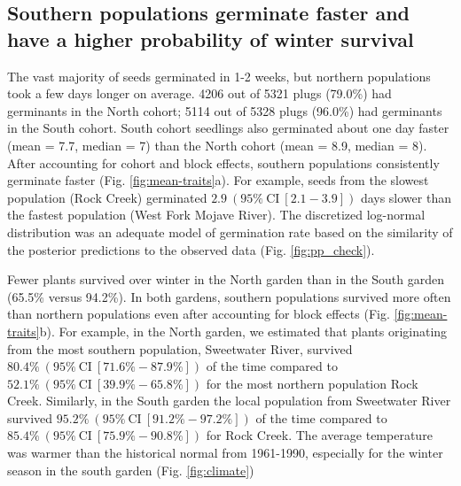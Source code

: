 \documentclass[
  12pt,
]{article}
\begin{document}
\hypertarget{southern-populations-germinate-faster-and-have-a-higher-probability-of-winter-survival}{%
\subsection{Southern populations germinate faster and have a higher probability of winter survival}\label{southern-populations-germinate-faster-and-have-a-higher-probability-of-winter-survival}}

The vast majority of seeds germinated in 1-2 weeks, but northern populations took a few days longer on average. 4206 out of 5321 plugs (79.0\%) had germinants in the North cohort; 5114 out of 5328 plugs (96.0\%) had germinants in the South cohort. South cohort seedlings also germinated about one day faster (mean = 7.7, median = 7) than the North cohort (mean = 8.9, median = 8). After accounting for cohort and block effects, southern populations consistently germinate faster (Fig. \ref{fig:mean-traits}a). For example, seeds from the slowest population (Rock Creek) germinated \(2.9~(95\%~\text{CI}~[2.1-3.9])\) days slower than the fastest population (West Fork Mojave River). The discretized log-normal distribution was an adequate model of germination rate based on the similarity of the posterior predictions to the observed data (Fig. \ref{fig:pp_check}).

Fewer plants survived over winter in the North garden than in the South garden (65.5\% versus 94.2\%). In both gardens, southern populations survived more often than northern populations even after accounting for block effects (Fig. \ref{fig:mean-traits}b). For example, in the North garden, we estimated that plants originating from the most southern population, Sweetwater River, survived \(80.4\%~(95\%~\text{CI}~[71.6\%-87.9\%])\) of the time compared to \(52.1\%~(95\%~\text{CI}~[39.9\%-65.8\%])\) for the most northern population Rock Creek. Similarly, in the South garden the local population from Sweetwater River survived \(95.2\%~(95\%~\text{CI}~[91.2\%-97.2\%])\) of the time compared to \(85.4\%~(95\%~\text{CI}~[75.9\%-90.8\%])\) for Rock Creek. The average temperature was warmer than the historical normal from 1961-1990, especially for the winter season in the south garden (Fig. \ref{fig:climate})
\end{document}
